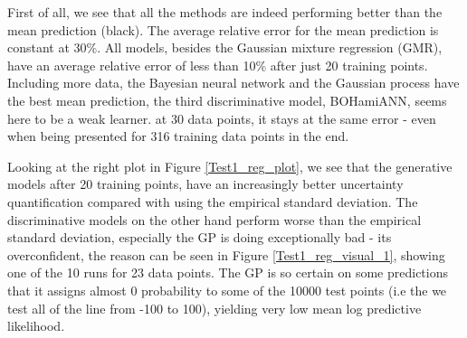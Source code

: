 First of all, we see that all the methods are indeed performing better than the mean prediction
(black). The average relative error for the mean prediction is constant at 30\%. All models, besides the
Gaussian mixture regression (GMR), have an average relative error of less than 10\% after just 20 training
points. Including more data, the Bayesian neural network and the Gaussian process have the best mean prediction, 
the third discriminative model, BOHamiANN, seems here to be a weak learner. at 30 data points, it stays at the
same error - even when being presented for 316 training data points in the end. 

Looking at the right plot in Figure \ref{Test1_reg_plot}, we see that the generative models after 20
training points, have an increasingly better uncertainty quantification compared with using the empirical
standard deviation. %
The discriminative models on the other hand perform worse than the empirical standard deviation, 
especially the GP is doing exceptionally bad - its overconfident, the reason can be seen in Figure \ref{Test1_reg_visual_1},  
showing one of the 10 runs for 23 data points. The GP is so certain on some predictions that it assigns
almost 0 probability to some of the 10000 test points (i.e the we test all of the line from -100 to 100),
 yielding very low mean log predictive likelihood. 
